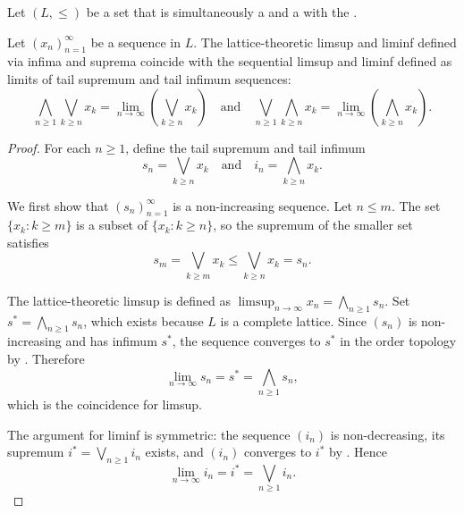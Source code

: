 \begin{proposition} \label{proposition:limsup_liminf_coincide_for_complete_linear_orders}
Let $(L, \leq)$ be a set that is simultaneously a  and a  with the .

Let $(x_n)_{n=1}^\infty$ be a sequence in $L$. The lattice-theoretic limsup and liminf defined via infima and suprema coincide with the sequential limsup and liminf defined as limits of tail supremum and tail infimum sequences:
$$\bigwedge_{n \geq 1} \bigvee_{k \geq n} x_k = \lim_{n \to \infty} \left( \bigvee_{k \geq n} x_k \right) \quad \text{and} \quad \bigvee_{n \geq 1} \bigwedge_{k \geq n} x_k = \lim_{n \to \infty} \left( \bigwedge_{k \geq n} x_k \right).$$
\end{proposition}
\begin{proof}
    For each $n \geq 1$, define the tail supremum and tail infimum
    $$s_n = \bigvee_{k \geq n} x_k \quad \text{and} \quad i_n = \bigwedge_{k \geq n} x_k.$$

    We first show that $(s_n)_{n=1}^\infty$ is a non-increasing sequence. Let $n \leq m$. The set $\{x_k : k \geq m\}$ is a subset of $\{x_k : k \geq n\}$, so the supremum of the smaller set satisfies
    $$s_m = \bigvee_{k \geq m} x_k \leq \bigvee_{k \geq n} x_k = s_n.$$

    The lattice-theoretic limsup is defined as $\limsup_{n \to \infty} x_n = \bigwedge_{n \geq 1} s_n$. Set $s^* = \bigwedge_{n \geq 1} s_n$, which exists because $L$ is a complete lattice. Since $(s_n)$ is non-increasing and has infimum $s^*$, the sequence converges to $s^*$ in the order topology by . Therefore
    $$\lim_{n \to \infty} s_n = s^* = \bigwedge_{n \geq 1} s_n,$$
    which is the coincidence for limsup.

    The argument for liminf is symmetric: the sequence $(i_n)$ is non-decreasing, its supremum $i^* = \bigvee_{n \geq 1} i_n$ exists, and $(i_n)$ converges to $i^*$ by . Hence
    $$\lim_{n \to \infty} i_n = i^* = \bigvee_{n \geq 1} i_n.$$
\end{proof}
